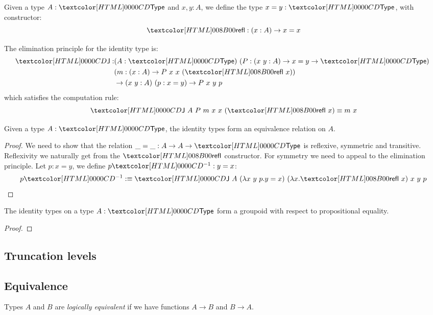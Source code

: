 \begin{definition}
  Given a type $A : \Type$ and $x, y : A$, we define the type
  $x = y : \Type$, with constructor:
  $$
  \refl : (x : A) \to x = x
  $$

  The elimination principle for the identity type is:
  \begin{align*}
  \J : &(A : \Type)\ (P : (x\ y : A) \to x = y \to \Type)\ \\
  &(m : (x : A) \to P\ x\ x\ (\refl\ x)) \\
  &\to (x\ y : A)\ (p : x = y) \to P\ x\ y\ p
  \end{align*}
  which satisfies the computation rule:
  $$
  \J\ A\ P\ m\ x\ x\ (\refl\ x) \defeq m\ x
  $$
\end{definition}

\begin{lemma}
  Given a type $A : \Type$, the identity types form an equivalence
  relation on $A$.
\end{lemma}

\begin{proof}
  We need to show that the relation $\_ = \_ : A \to A \to \Type$ is
  reflexive, symmetric and transitive. Reflexivity we naturally get
  from the $\refl$ constructor. For symmetry we need to appeal to the
  elimination principle. Let $p : x = y$, we define $\sym{p} : y = x$:
  $$
  \sym{p} \ddefeq \J\ A\ (\lambda x\ y\ p . y = x)\ (\lambda x . \refl\ x)\ x\ y\ p
  $$
\end{proof}

\begin{lemma}
  The identity types on a type $A : \Type$ form a groupoid with
  respect to propositional equality.
\end{lemma}

\begin{proof}
  
\end{proof}

\subsection{Truncation levels}

\subsection{Equivalence}

\begin{definition}
  Types $A$ and $B$ are \emph{logically equivalent} if we have
  functions $A \to B$ and $B \to A$.
\end{definition}


